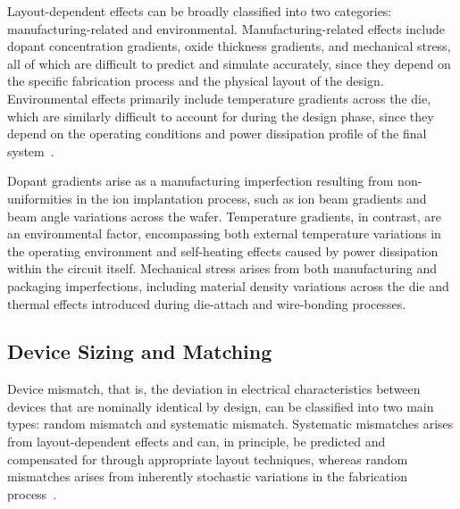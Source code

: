 Layout-dependent effects can be broadly classified into two categories: manufacturing-related and environmental. Manufacturing-related effects include dopant concentration gradients, oxide thickness gradients, and mechanical stress, all of which are difficult to predict and simulate accurately, since they depend on the specific fabrication process and the physical layout of the design. Environmental effects primarily include temperature gradients across the die, which are similarly difficult to account for during the design phase, since they depend on the operating conditions and power dissipation profile of the final system~\cite{layout_fundamentals}.

Dopant gradients arise as a manufacturing imperfection resulting from non-uniformities in the ion implantation process, such as ion beam gradients and beam angle variations across the wafer. Temperature gradients, in contrast, are an environmental factor, encompassing both external temperature variations in the operating environment and self-heating effects caused by power dissipation within the circuit itself. Mechanical stress arises from both manufacturing and packaging imperfections, including material density variations across the die and thermal effects introduced during die-attach and wire-bonding processes.


\subsection{Device Sizing and Matching}\label{sec:device_matching} 

Device mismatch, that is, the deviation in electrical characteristics between devices that are nominally identical by design, can be classified into two main types: random mismatch and systematic mismatch. Systematic mismatches arises from layout-dependent effects and can, in principle, be predicted and compensated for through appropriate layout techniques, whereas random mismatches arises from inherently stochastic variations in the fabrication process~\cite{layout_fundamentals}.

